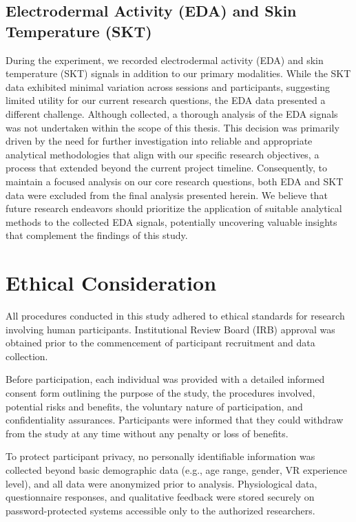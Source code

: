 \documentclass{CPP}
\begin{document}
\subsection{Electrodermal Activity (EDA) and Skin Temperature (SKT)}

During the experiment, we recorded electrodermal activity (EDA) and skin temperature (SKT) signals in addition to our primary modalities. While the SKT data exhibited minimal variation across sessions and participants, suggesting limited utility for our current research questions, the EDA data presented a different challenge. Although collected, a thorough analysis of the EDA signals was not undertaken within the scope of this thesis. This decision was primarily driven by the need for further investigation into reliable and appropriate analytical methodologies that align with our specific research objectives, a process that extended beyond the current project timeline. Consequently, to maintain a focused analysis on our core research questions, both EDA and SKT data were excluded from the final analysis presented herein. We believe that future research endeavors should prioritize the application of suitable analytical methods to the collected EDA signals, potentially uncovering valuable insights that complement the findings of this study.

\section{Ethical Consideration}

All procedures conducted in this study adhered to ethical standards for research involving human participants. Institutional Review Board (IRB) approval was obtained prior to the commencement of participant recruitment and data collection.

Before participation, each individual was provided with a detailed informed consent form outlining the purpose of the study, the procedures involved, potential risks and benefits, the voluntary nature of participation, and confidentiality assurances. Participants were informed that they could withdraw from the study at any time without any penalty or loss of benefits.

To protect participant privacy, no personally identifiable information was collected beyond basic demographic data (e.g., age range, gender, VR experience level), and all data were anonymized prior to analysis. Physiological data, questionnaire responses, and qualitative feedback were stored securely on password-protected systems accessible only to the authorized researchers.
\end{document}
